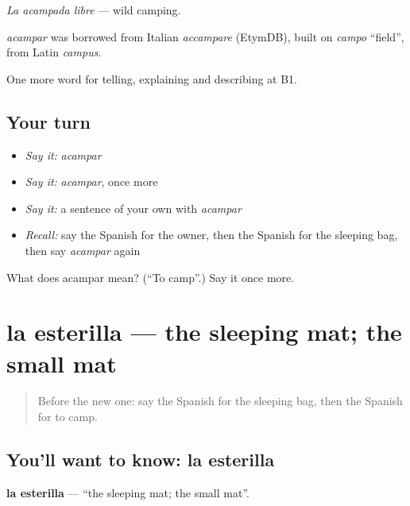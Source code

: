 \emph{La acampada libre} — wild camping.

\begin{cousinweb}
\emph{acampar} was borrowed from Italian \emph{accampare} (EtymDB), built on \emph{campo} \textquotedblleft{}field\textquotedblright{}, from Latin \emph{campus}.
\end{cousinweb}

\begin{grammarlens}[title={What you've built}]
One more word for telling, explaining and describing at B1.
\end{grammarlens}

\subsection*{Your turn}
\begin{itemize}
\raggedright
  \item \emph{Say it:} \emph{acampar}
  \item \emph{Say it:} \emph{acampar}, once more
  \item \emph{Say it:} a sentence of your own with \emph{acampar}
  \item \emph{Recall:} say the Spanish for the owner, then the Spanish for the sleeping bag, then say \emph{acampar} again
\end{itemize}

\begin{tcolorbox}[breakable,colback=teal!4,colframe=teal!35!black,title={Before you move on}]
What does acampar mean? (\textquotedblleft{}To camp\textquotedblright{}.) Say it once more.
\end{tcolorbox}
\section[la esterilla]{la esterilla — the sleeping mat; the small mat}

\label{lesson:ES-C666-esterilla}



\begin{quote}
Before the new one: say the Spanish for the sleeping bag, then the Spanish for to camp.
\end{quote}

\subsection*{You'll want to know: la esterilla}
\textbf{la esterilla} — \textquotedblleft{}the sleeping mat; the small mat\textquotedblright{}.

